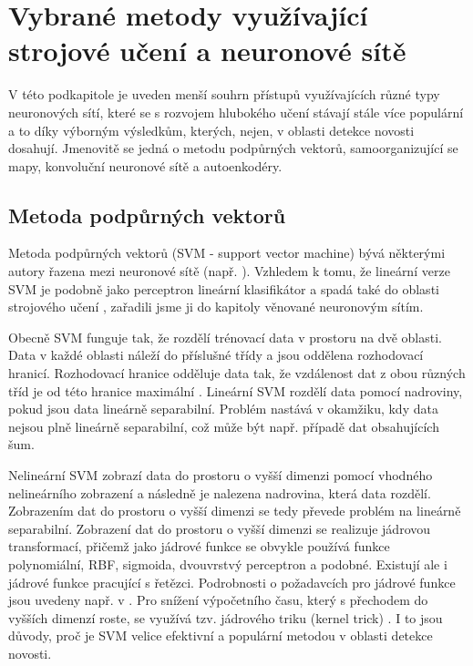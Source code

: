 \section{Vybrané metody využívající strojové učení a neuronové sítě}\label{chap:nn_reserse}
V této podkapitole je uveden menší souhrn přístupů  využívajících různé typy neuronových sítí, které se s rozvojem hlubokého učení stávají stále více populární a to díky výborným výsledkům, kterých, nejen, v oblasti detekce novosti dosahují. Jmenovitě se jedná o metodu podpůrných vektorů, samoorganizující se mapy, konvoluční neuronové sítě a autoenkodéry.
\subsection{Metoda podpůrných vektorů}
Metoda podpůrných vektorů \cite{svm2} (SVM - support vector machine) bývá některými autory řazena mezi neuronové sítě (např. \cite{markou2}). Vzhledem k tomu, že lineární verze SVM \cite{svm1} je podobně jako perceptron \cite{perceptron} lineární klasifikátor a spadá také do oblasti strojového učení \cite{ml1,ml2}, zařadili jsme ji do kapitoly věnované neuronovým sítím.
\par 
Obecně SVM funguje tak, že rozdělí trénovací data v prostoru na dvě oblasti. Data v každé oblasti náleží do příslušné třídy a jsou oddělena rozhodovací hranicí. Rozhodovací hranice odděluje data tak, že vzdálenost dat z obou různých tříd je od této hranice maximální \cite{svm3}. Lineární SVM rozdělí data pomocí nadroviny, pokud jsou data lineárně separabilní. Problém nastává v okamžiku, kdy data nejsou plně lineárně separabilní, což může být např.  případě dat obsahujících šum.
\par 
Nelineární SVM \cite{svm1} zobrazí data do prostoru o vyšší dimenzi pomocí vhodného nelineárního zobrazení a následně je nalezena nadrovina, která data rozdělí. Zobrazením dat do prostoru o vyšší dimenzi se tedy převede problém na lineárně separabilní. Zobrazení dat do prostoru o vyšší dimenzi se realizuje jádrovou transformací, přičemž jako jádrové funkce se obvykle používá funkce polynomiální, RBF, sigmoida, dvouvrstvý perceptron a podobné. Existují ale i jádrové funkce pracující s řetězci. Podrobnosti o požadavcích pro jádrové funkce jsou uvedeny např. v \cite{svm4}. Pro snížení výpočetního času, který s přechodem do vyšších dimenzí roste, se využívá tzv. jádrového triku (kernel trick) \cite{kernel}. I to jsou důvody, proč je SVM velice efektivní a populární metodou v oblasti detekce novosti.
\par 
